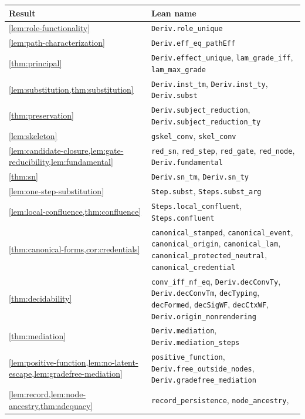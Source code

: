 \documentclass[11pt]{article}
\numberwithin{equation}{section}
\theoremstyle{definition}
\theoremstyle{plain}
\theoremstyle{remark}
\begin{document}
\begin{table}[tbp]
\centering
\small
\begin{tabularx}{\textwidth}{@{}>{\raggedright\arraybackslash}p{}>{\raggedright\arraybackslash}X@{}}
\toprule
Result & Lean name\\
\midrule
\cref{lem:role-functionality} & \texttt{Deriv.role\_unique}\\
\cref{lem:path-characterization} & \texttt{Deriv.eff\_eq\_pathEff}\\
\cref{thm:principal} & \texttt{Deriv.effect\_unique}, \texttt{lam\_grade\_iff},
\texttt{lam\_max\_grade}\\
\cref{lem:substitution,thm:substitution} & \texttt{Deriv.inst\_tm},
\texttt{Deriv.inst\_ty}, \texttt{Deriv.subst}\\
\cref{thm:preservation} & \texttt{Deriv.subject\_reduction},
\texttt{Deriv.subject\_reduction\_ty}\\
\cref{lem:skeleton} & \texttt{gskel\_conv}, \texttt{skel\_conv}\\
\cref{lem:candidate-closure,lem:gate-reducibility,lem:fundamental} &
\texttt{red\_sn}, \texttt{red\_step}, \texttt{red\_gate}, \texttt{red\_node},
\texttt{Deriv.fundamental}\\
\cref{thm:sn} & \texttt{Deriv.sn\_tm}, \texttt{Deriv.sn\_ty}\\
\cref{lem:one-step-substitution} & \texttt{Step.subst},
\texttt{Steps.subst\_arg}\\
\cref{lem:local-confluence,thm:confluence} & \texttt{Steps.local\_confluent},
\texttt{Steps.confluent}\\
\cref{thm:canonical-forms,cor:credentials} & \texttt{canonical\_stamped},
\texttt{canonical\_event}, \texttt{canonical\_origin},
\texttt{canonical\_lam}, \texttt{canonical\_protected\_neutral},
\texttt{canonical\_credential}\\
\cref{thm:decidability} & \texttt{conv\_iff\_nf\_eq},
\texttt{Deriv.decConvTy}, \texttt{Deriv.decConvTm}, \texttt{decTyping},
\texttt{decFormed}, \texttt{decSigWF}, \texttt{decCtxWF},
\texttt{Deriv.origin\_nonrendering}\\
\cref{thm:mediation} & \texttt{Deriv.mediation},
\texttt{Deriv.mediation\_steps}\\
\cref{lem:positive-function,lem:no-latent-escape,lem:gradefree-mediation} &
\texttt{positive\_function}, \texttt{Deriv.free\_outside\_nodes},
\texttt{Deriv.gradefree\_mediation}\\
\cref{lem:record,lem:node-ancestry,thm:adequacy} &
\texttt{record\_persistence}, \texttt{node\_ancestry},

\end{tabularx}
\end{table}
\end{document}
